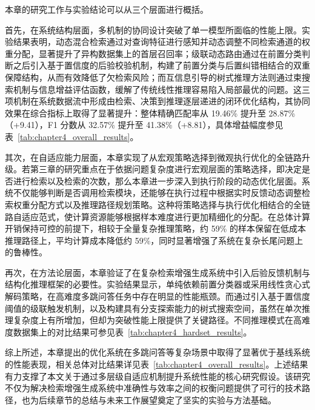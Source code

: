 本章的研究工作与实验结论可以从三个层面进行概括。

首先，在系统结构层面，多机制的协同设计突破了单一模型所面临的性能上限。实验结果表明，动态混合检索通过对查询特征进行感知并动态调整不同检索通道的权重分配，显著提升了异构数据集上的首层召回率；级联动态路由通过在前置分类判断之后引入基于置信度的后验校验机制，构建了前置分类与后置纠错相结合的双重保障结构，从而有效降低了欠检索风险；而互信息引导的树式推理方法则通过束搜索机制与信息增益评估函数，缓解了传统线性推理容易陷入局部最优的问题。这三项机制在系统数据流中形成由检索、决策到推理逐层递进的闭环优化结构，其协同效果在综合指标上取得了显著提升：整体精确匹配率从 19.46\% 提升至 28.87\%（+9.41），F1 分数从 32.57\% 提升至 41.38\%（+8.81），具体增益幅度参见表~\ref{tab:chapter4_overall_results}。

其次，在自适应能力层面，本章实现了从宏观策略选择到微观执行优化的全链路升级。若第三章的研究重点在于依据问题复杂度进行宏观层面的策略选择，即决定是否进行检索以及检索的次数，那么本章进一步深入到执行阶段的动态优化层面。系统不仅能够判断是否调用检索模块，还能够在执行过程中根据实时反馈动态调整检索权重分配方式以及推理路径规划策略。这种将策略选择与执行优化相结合的全链路自适应范式，使计算资源能够根据样本难度进行更加精细化的分配。在总体计算开销保持可控的前提下，相较于全量复杂推理策略，约 59\% 的样本保留在低成本推理路径上，平均计算成本降低约 59\%，同时显著增强了系统在复杂长尾问题上的鲁棒性。

再次，在方法论层面，本章验证了在复杂检索增强生成系统中引入后验反馈机制与结构化推理框架的必要性。实验结果显示，单纯依赖前置分类器或采用线性贪心式解码策略，在高难度多跳问答任务中存在明显的性能瓶颈。而通过引入基于置信度阈值的级联触发机制，以及构建具有分支探索能力的树式搜索空间，虽然在单次推理复杂度上有所增加，但却为突破性能上限提供了关键路径。不同推理模式在高难度数据集上的对比结果可参见表~\ref{tab:chapter4_hardset_results}。

综上所述，本章提出的优化系统在多跳问答等复杂场景中取得了显著优于基线系统的性能表现，相关总体对比结果详见表~\ref{tab:chapter4_overall_results}。上述结果有力支撑了本文关于通过多层级自适应机制提升系统性能的核心研究假设。该研究不仅为解决检索增强生成系统中准确性与效率之间的权衡问题提供了可行的技术路径，也为后续章节的总结与未来工作展望奠定了坚实的实验与方法基础。
